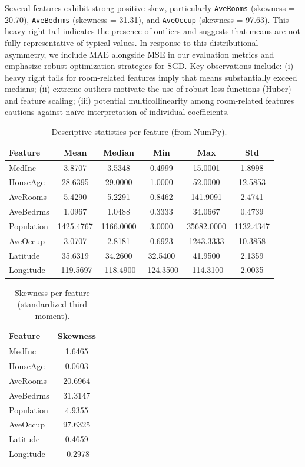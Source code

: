 \documentclass[runningheads]{llncs}
\begin{document}
Several features exhibit strong positive skew, particularly \texttt{AveRooms} (skewness = 20.70), \texttt{AveBedrms} (skewness = 31.31), and \texttt{AveOccup} (skewness = 97.63). This heavy right tail indicates the presence of outliers and suggests that means are not fully representative of typical values. In response to this distributional asymmetry, we include MAE alongside MSE in our evaluation metrics and emphasize robust optimization strategies for SGD. Key observations include: (i) heavy right tails for room-related features imply that means substantially exceed medians; (ii) extreme outliers motivate the use of robust loss functions (Huber) and feature scaling; (iii) potential multicollinearity among room-related features cautions against naïve interpretation of individual coefficients.

\begin{table}[H]
  \centering
  \caption{Descriptive statistics per feature (from NumPy).}
  \label{tab:desc-stats}
  \begin{tabular}{lccccc}
    \toprule
    Feature & Mean & Median & Min & Max & Std \\
    \midrule
    MedInc    & 3.8707  & 3.5348  & 0.4999   & 15.0001   & 1.8998 \\
    HouseAge  & 28.6395 & 29.0000 & 1.0000   & 52.0000   & 12.5853 \\
    AveRooms  & 5.4290  & 5.2291  & 0.8462   & 141.9091  & 2.4741 \\
    AveBedrms & 1.0967  & 1.0488  & 0.3333   & 34.0667   & 0.4739 \\
    Population& 1425.4767 & 1166.0000 & 3.0000 & 35682.0000 & 1132.4347 \\
    AveOccup  & 3.0707  & 2.8181  & 0.6923   & 1243.3333 & 10.3858 \\
    Latitude  & 35.6319 & 34.2600 & 32.5400  & 41.9500   & 2.1359 \\
    Longitude & -119.5697 & -118.4900 & -124.3500 & -114.3100 & 2.0035 \\
    \bottomrule
  \end{tabular}
\end{table}

\begin{table}[H]
  \centering
  \caption{Skewness per feature (standardized third moment).}
  \label{tab:skew}
  \begin{tabular}{lc}
    \toprule
    Feature & Skewness \\
    \midrule
    MedInc    & 1.6465 \\
    HouseAge  & 0.0603 \\
    AveRooms  & 20.6964 \\
    AveBedrms & 31.3147 \\
    Population& 4.9355 \\
    AveOccup  & 97.6325 \\
    Latitude  & 0.4659 \\
    Longitude & -0.2978 \\
    \bottomrule
  \end{tabular}
\end{table}
\end{document}
